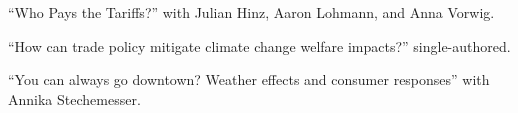 \documentclass{article}
\newlength{\cvlabelwidth}\setlength{\cvlabelwidth}{0.12\textwidth}
\newlength{\cvlabelgap}\setlength{\cvlabelgap}{5mm}
\newcommand{\cvmakelabel}[1]{%
    \smash{\parbox[t]{\cvlabelwidth}{\raggedright{\fontfamily{phv}\selectfont #1}}}}
\newenvironment{cvsection}[1]{%
    \par\medskip
    \begin{list}{}{%
        \setlength{\leftmargin}{\dimexpr\cvlabelwidth+\cvlabelgap\relax}%
        \setlength{\labelwidth}{\cvlabelwidth}%
        \setlength{\labelsep}{\cvlabelgap}%
        \setlength{\rightmargin}{0pt}%
        \setlength{\itemindent}{0pt}%
        \setlength{\listparindent}{0pt}%
        \setlength{\topsep}{0pt}%
        \setlength{\partopsep}{0pt}%
        \setlength{\parsep}{0.3em}%
        \setlength{\itemsep}{0pt}%
        \let\makelabel\cvmakelabel%
    }%
    \item[#1]\ignorespaces%
}{%
    \end{list}\medskip%
}
\begin{document}
\begin{cvsection}{SELECTED WORK-IN-PROGRESS}
    ``Who Pays the Tariffs?'' with Julian Hinz, Aaron Lohmann, and Anna Vorwig.\par
    ``How can trade policy mitigate climate change welfare impacts?'' single-authored.\par
    ``You can always go downtown? Weather effects and consumer responses'' with Annika Stechemesser.\par
\end{cvsection}

\end{document}
